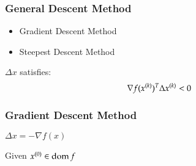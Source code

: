 \begin{frame}
\end{frame}

\begin{frame}
  \frametitle{General Descent Method}
  \begin{itemize}
  \item Gradient Descent Method
  \item Steepest Descent Method
  \end{itemize}
  $\Delta x$ satisfies:
  $$\nabla f(x^{(k)})^T\Delta x^{(k)} < 0$$

\end{frame}


\begin{frame}
  \frametitle{Gradient Descent Method}
  \begin{greenblock}{$\Delta x = -\nabla f(x)$}
    \begin{algorithm}[H]
      \small
      Given $x^{(0)} \in \operatorname{dom} f$\;
    \end{algorithm}
  \end{greenblock}
\end{frame}

